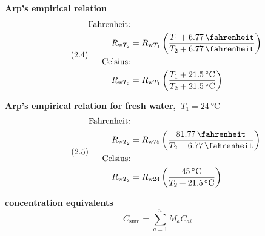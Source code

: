 \textbf{Arp's empirical relation}
\begin{equation*}\tag{2.4}
    \begin{aligned}
        \text{Fahrenheit:} &                                                                                                   \\
        R_{\mathrm{w}T_2}  & = R_{\mathrm{w}T_1}\left(\frac{T_1 + \SI{6.77}{\fahrenheit}}{T_2 + \SI{6.77}{\fahrenheit}}\right) \\
        \text{Celsius:}    &                                                                                                   \\
        R_{\mathrm{w}T_2}  & = R_{\mathrm{w}T_1}\left(\frac{T_1 + \SI{21.5}{\celsius}}{T_2 + \SI{21.5}{\celsius}}\right)
    \end{aligned}
\end{equation*}

\textbf{Arp's empirical relation for fresh water, $\ T_1=\SI{24}{\celsius}$}
\begin{equation*}\tag{2.5}
    \begin{aligned}
        \text{Fahrenheit:} &                                                                                             \\
        R_{\mathrm{w}T_2}  & = R_{\mathrm{w}75}\left(\frac{\SI{81.77}{\fahrenheit}}{T_2 + \SI{6.77}{\fahrenheit}}\right) \\
        \text{Celsius:}    &                                                                                             \\
        R_{\mathrm{w}T_2}  & = R_{\mathrm{w}24}\left(\frac{\SI{45}{\celsius}}{T_2 + \SI{21.5}{\celsius}}\right)
    \end{aligned}
\end{equation*}

\textbf{ concentration equivalents}
\begin{equation*}
    C_\mathrm{sum} = \sum_{a=1}^{n} M_a C_{ai}\tag{2.6}
\end{equation*}

